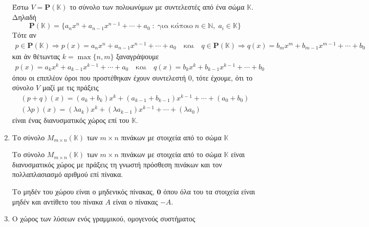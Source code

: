 \begin{examples}
\begin{enumerate}
            Έστω $ V = \mathbf{P}(\mathbb{K}) $ το σύνολο των πολυωνύμων  
            με συντελεστές από ένα σώμα $ \mathbb{K} $. Δηλαδή 
            \[
                \mathbf{P}(\mathbb{K}) = \{ a_{n}x^{n}+a_{n-1}x^{n-1}+\cdots + a_{0} \; 
                : \; \text{για κάποιο} \; n \in \mathbb{N}, \; a_{i} \in \mathbb{K}\}  
            \] 
            Τότε αν 
            \begin{gather*}
                p \in \mathbf{P}(\mathbb{K}) \Rightarrow p(x)
                = a_{n}x^{n}+a_{n-1}x^{n-1}+\cdots + a_{0} \quad \text{και} 
                \quad q \in \mathbf{P}(\mathbb{K}) \Rightarrow 
                q(x) = b_{m}x^{m}+b_{m-1}x^{m-1}+\cdots + b_{0} 
            \end{gather*} 
            και άν θέτωντας $ k = \max \{ n,m \} $ ξαναγράψουμε 
            \begin{gather*}
                p(x) = a_{k}x^{k}+a_{k-1}x^{k-1}+\cdots + a_{0} \quad \text{και} \quad
                q(x) = b_{k}x^{k}+b_{k-1}x^{k-1}+\cdots + b_{0} 
            \end{gather*}
            όπου οι επιπλέον όροι που προστέθηκαν έχουν συντελεστή 0, τότε έχουμε, 
            ότι το σύνολο $ V $ μαζί με τις πράξεις 
            \begin{gather*}
                (p+q)(x) = (a_{k}+ b_{k})x^{k} + 
                (a_{k-1}+b_{k-1})x^{k-1}+ \cdots + (a_{0}+ b_{0}) \\
                (\lambda p)(x) = (\lambda a_{k})x^{k}+
                ( \lambda a_{k-1})x^{k-1}+ \cdots + ( \lambda a_{0})
            \end{gather*} 
            είναι ένας διανυσματικός χώρος επί του $ \mathbb{K} $.

        \item \label{ex:mat} \textcolor{Col2}{Το σύνολο $ M_{m \times n}(\mathbb{K}) $ 
            των $ m \times n $ πινάκων με στοιχεία από το σώμα $ \mathbb{K} $}

            Το σύνολο $ M_{m \times n}(\mathbb{K}) $ των $ m \times n $ πινάκων 
            με στοιχεία από το σώμα $ \mathbb{K} $ είναι διανυσματικός χώρος 
            με πράξεις τη γνωστή πρόσθεση πινάκων και τον πολλαπλασιασμό 
            αριθμού επί πίνακα.

            Το μηδέν του χώρου είναι ο μηδενικός πίνακας, $ \mathbf{0} $ όπου 
            όλα του τα στοιχεία είναι μηδέν και αντίθετο του πίνακα $A$ είναι 
            ο πίνακας $ -A $.

        \item\label{ex:omsy} 
            \textcolor{Col2}{Ο χώρος των λύσεων ενός γραμμικού, ομογενούς 
            συστήματος}


\end{enumerate}
\end{examples}

